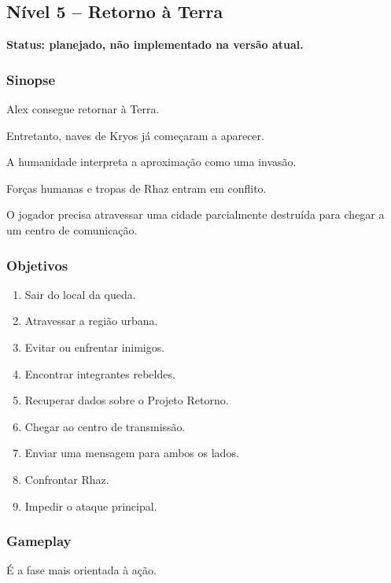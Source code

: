 \documentclass[12pt,a4paper]{article}
\begin{document}

\subsection{Nível 5 -- Retorno à Terra}

\textbf{Status: planejado, não implementado na versão atual.}


\subsubsection*{Sinopse}

Alex consegue retornar à Terra.

Entretanto, naves de Kryos já começaram a aparecer.

A humanidade interpreta a aproximação como uma invasão.

Forças humanas e tropas de Rhaz entram em conflito.

O jogador precisa atravessar uma cidade parcialmente destruída para
chegar a um centro de comunicação.

\subsubsection*{Objetivos}

\begin{enumerate}
    \item Sair do local da queda.
    \item Atravessar a região urbana.
    \item Evitar ou enfrentar inimigos.
    \item Encontrar integrantes rebeldes.
    \item Recuperar dados sobre o Projeto Retorno.
    \item Chegar ao centro de transmissão.
    \item Enviar uma mensagem para ambos os lados.
    \item Confrontar Rhaz.
    \item Impedir o ataque principal.
\end{enumerate}

\subsubsection*{Gameplay}

É a fase mais orientada à ação.
\end{document}
